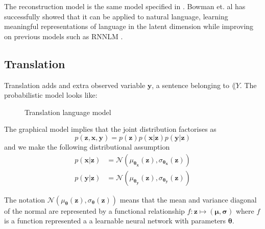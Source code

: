 The reconstruction model is the same model specified in
\cite{kingma_auto-encoding_2013}. Bowman et. al has successfully showed that it
can be applied to natural language, learning meaningful representations of
language in the latent dimension \cite{bowman_generating_2015} while improving
on previous models such as RNNLM \cite{conf/icassp/MikolovKBCK11}.

\subsection{Translation}

Translation adds and extra observed variable $\bm{y}$, a sentence belonging to
$\lang{Y}$. The probabilistic model looks like:

\begin{figure}[H]
  \center
  \caption{Translation language model}
\end{figure}

The graphical model implies that the joint distribution factorises as
\begin{equation}
  \label{eq:joint_generative}
  p(\bm{\bm{z}}, \bm{x}, \bm{y}) = p(\bm{z})p(\bm{x} | \bm{z})p(\bm{y} | \bm{z})
\end{equation}
and we make the following distributional assumption
\begin{align}
  p(\bm{x} | \bm{z}) & = \mathcal{N}(\mu_{\bm{\theta}_{\bm{x}}}(\bm{z}), \sigma_{\bm{\theta}_{\bm{x}}}(\bm{z})) \\
  p(\bm{y} | \bm{z}) & = \mathcal{N}(\mu_{\bm{\theta}_{\bm{y}}}(\bm{z}), \sigma_{\bm{\theta}_{\bm{y}}}(\bm{z}))
\end{align}

The notation $\mathcal{N}(\mu_{\bm{\theta}}(\bm{z}), \sigma_{\bm{\theta}}(\bm{z}))$
means that the mean and variance diagonal of the normal are represented by a
functional relationship $f: \bm{z} \mapsto (\bm{\mu}, \bm{\sigma})$ where $f$ is a function
represented a a learnable neural network with parameters $\bm{\theta}$.

